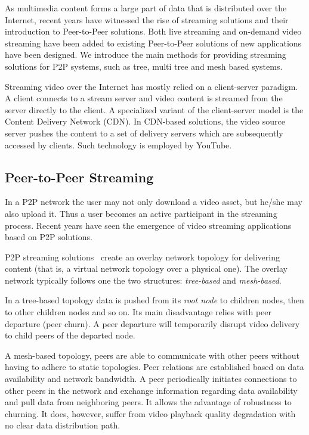 As multimedia content forms a large part of data that is distributed over the
Internet, recent years have witnessed the rise of streaming solutions and
their introduction to Peer-to-Peer solutions. Both live streaming and
on-demand video streaming have been added to existing Peer-to-Peer solutions
of new applications have been designed. We introduce the main methods for
providing streaming solutions for P2P systems, such as tree, multi tree and
mesh based systems.

Streaming video over the Internet has mostly relied on a client-server
paradigm. A client connects to a stream server and video content is streamed
from the server directly to the client. A specialized variant of the
client-server model is the Content Delivery Network (CDN). In CDN-based
solutions, the video source server pushes the content to a set of delivery
servers which are subsequently accessed by clients. Such technology is
employed by YouTube.

\subsection{Peer-to-Peer Streaming}
\label{subsec:p2p-systems:p2p-streaming-p2p}

In a P2P network the user may not only download a video asset, but he/she may
also upload it. Thus a user becomes an active participant in the streaming
process. Recent years have seen the emergence of video streaming applications
based on P2P solutions.

P2P streaming solutions~\cite{p2p-streaming-survey} create an overlay network topology for
delivering content (that is, a virtual network topology over a physical one).
The overlay network typically follows one the two structures:
\textit{tree-based} and \textit{mesh-based}.

In a tree-based topology data is pushed from its \textit{root node} to
children nodes, then to other children nodes and so on. Its main disadvantage
relies with peer departure (peer churn). A peer departure will temporarily
disrupt video delivery to child peers of the departed node.

A mesh-based topology, peers are able to communicate with other peers without
having to adhere to static topologies. Peer relations are established based on
data availability and network bandwidth. A peer periodically initiates
connections to other peers in the network and exchange information regarding
data availability and pull data from neighboring peers. It allows the
advantage of robustness to churning. It does, however, suffer from video
playback quality degradation with no clear data distribution path.

